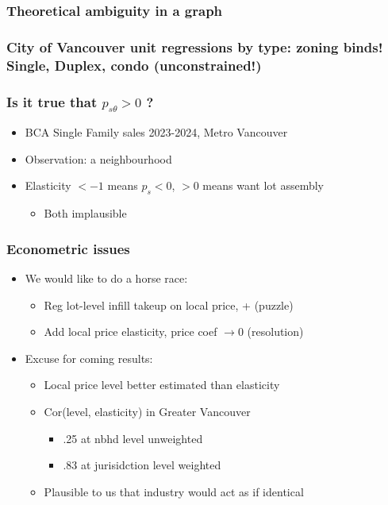 \documentclass{beamer}
\begin{document}
\begin{frame}
	\frametitle{Theoretical ambiguity in a graph}
\end{frame}


\begin{frame}
	\frametitle{City of Vancouver unit regressions by type: zoning binds!\\Single, Duplex, condo (unconstrained!)}
	\begin{footnotesize}
		
	\end{footnotesize}
\end{frame}

\begin{frame}
\frametitle{Is it true that $p_{s\theta}>0$ ?}
	\begin{itemize}
		\item BCA Single Family sales 2023-2024, Metro Vancouver
		\item Observation: a neighbourhood
		\item Elasticity $<-1$ means $p_{s}<0$, $>0$ means want lot assembly
			\begin{itemize}
				\item Both implausible
			\end{itemize}
	\end{itemize}
\end{frame}

\begin{frame}
	\frametitle{Econometric issues}
	\begin{itemize}
		\item We would like to do a horse race:
			\begin{itemize}
				\item Reg lot-level infill takeup on local price, + (puzzle)
				\item Add local price elasticity, price coef $\rightarrow 0$ (resolution)
			\end{itemize}
		\item Excuse for coming results: 
			\begin{itemize}
				\item Local price level better estimated than elasticity
				\item Cor(level, elasticity) in Greater Vancouver 
					\begin{itemize}
						\item .25 at nbhd level unweighted
						\item .83 at jurisidction level weighted
					\end{itemize}
				\item Plausible to us that industry would act as if identical
			\end{itemize}
	\end{itemize}
\end{frame}
\end{document}
